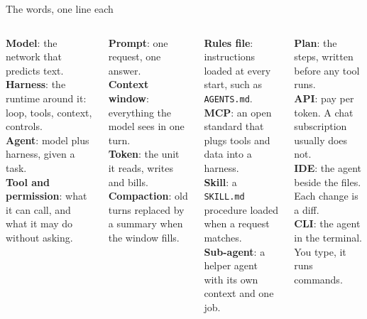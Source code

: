
\begin{frame}{The words, one line each}
  \vspace{0.15em}
  \begin{columns}[T,onlytextwidth]
      {\footnotesize
      \textbf{\color{ink}Model}: the network that predicts text.\\[0.45em]
      \textbf{\color{ink}Harness}: the runtime around it: loop, tools, context, controls.\\[0.45em]
      \textbf{\color{ink}Agent}: model plus harness, given a task.\\[0.45em]
      \textbf{\color{ink}Tool and permission}: what it can call, and what it may do without asking.\par}
      {\footnotesize
      \textbf{\color{ink}Prompt}: one request, one answer.\\[0.45em]
      \textbf{\color{ink}Context window}: everything the model sees in one turn.\\[0.45em]
      \textbf{\color{ink}Token}: the unit it reads, writes and bills.\\[0.45em]
      \textbf{\color{ink}Compaction}: old turns replaced by a summary when the window fills.\par}
      {\footnotesize
      \textbf{\color{ink}Rules file}: instructions loaded at every start, such as \texttt{AGENTS.md}.\\[0.45em]
      \textbf{\color{ink}MCP}: an open standard that plugs tools and data into a harness.\\[0.45em]
      \textbf{\color{ink}Skill}: a \texttt{SKILL.md} procedure loaded when a request matches.\\[0.45em]
      \textbf{\color{ink}Sub-agent}: a helper agent with its own context and one job.\par}
      {\footnotesize
      \textbf{\color{ink}Plan}: the steps, written before any tool runs.\\[0.4em]
      \textbf{\color{ink}API}: pay per token. A chat subscription usually does not.\\[0.4em]
      \textbf{\color{ink}IDE}: the agent beside the files. Each change is a diff.\\[0.4em]
      \textbf{\color{ink}CLI}: the agent in the terminal. You type, it runs commands.\par}
  \end{columns}
\end{frame}

